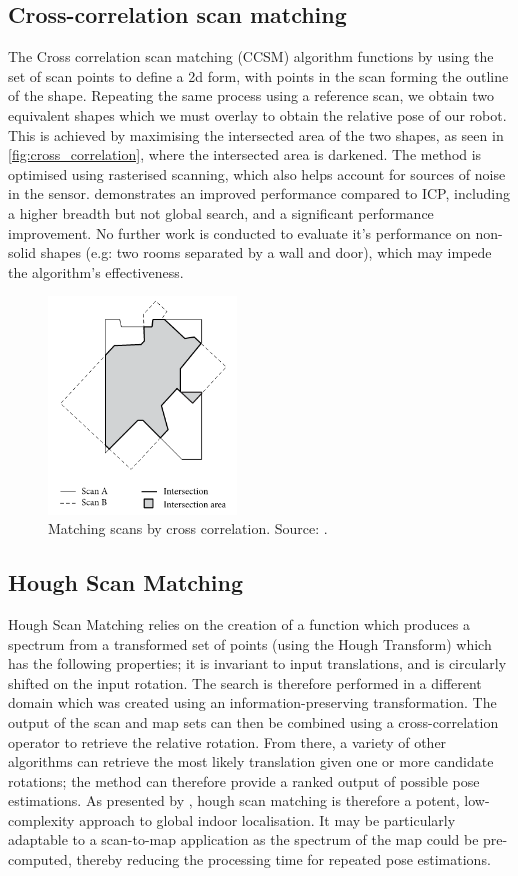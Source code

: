 \documentclass[authoryearcitations]{UoYCSproject}
\begin{document}
\subsection{Cross-correlation scan matching}
The Cross correlation scan matching (CCSM) algorithm functions by using the set of scan points to define a 2d form, with points in the scan forming the outline of the shape. Repeating the same process using a reference scan, we obtain two equivalent shapes which we must overlay to obtain the relative pose of our robot. This is achieved by maximising the intersected area of the two shapes, as seen in \autoref{fig:cross_correlation}, where the intersected area is darkened. The method is optimised using rasterised scanning, which also helps account for sources of noise in the sensor. \citet{Konecny2016-zv} demonstrates an improved performance compared to ICP, including a higher breadth but not global search, and a significant performance improvement. No further work is conducted to evaluate it's performance on non-solid shapes (e.g: two rooms separated by a wall and door), which may impede the algorithm's effectiveness. 

\begin{figure}[t]
	\centering
	\includegraphics[width=5cm,keepaspectratio]{images/cross_correlation.png}
	\caption{Matching scans by cross correlation. Source: \citet{Konecny2016-zv}.}
	\label{fig:cross_correlation}
\end{figure}

\subsection{Hough Scan Matching}
Hough Scan Matching relies on the creation of a function which produces a spectrum from a transformed set of points (using the Hough Transform) which has the following properties; it is invariant to input translations, and is circularly shifted on the input rotation. The search is therefore performed in a different domain which was created using an information-preserving transformation. The output of the scan and map sets can then be combined using a cross-correlation operator to retrieve the relative rotation. From there, a variety of other algorithms can retrieve the most likely translation given one or more candidate rotations; the method can therefore provide a ranked output of possible pose estimations. As presented by \citet{Censi2005-iv}, hough scan matching is therefore a potent, low-complexity approach to global indoor localisation. It may be particularly adaptable to a scan-to-map application as the spectrum of the map could be pre-computed, thereby reducing the processing time for repeated pose estimations.
\end{document}
